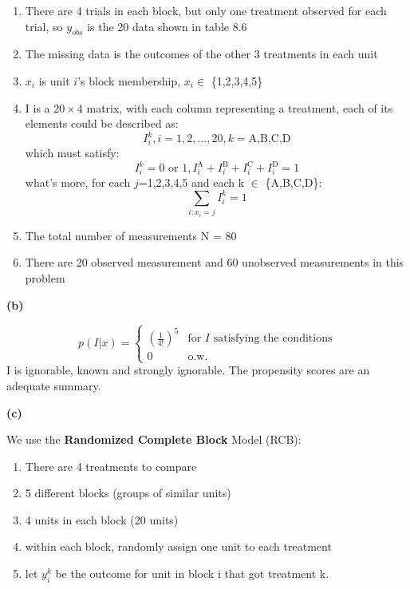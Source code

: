 \documentclass[letterpaper,11pt]{article}
\begin{document}
\begin{enumerate}
  \item There are 4 trials in each block, but only one treatment observed for each trial, so $y_{obs}$ is the 20 data shown in table 8.6
\item The missing data is the outcomes of the other 3 treatments in each unit
\item $x_i$ is unit $i$'s block membership, $x_i\in$ \{1,2,3,4,5\}
\item I is a $20\times 4$ matrix, with each column representing a treatment, each of its elements could be described as:
$$I_i^k,i=1,2,...,20,k=\text{A,B,C,D}$$
which must satisfy:
$$I_i^k = 0 \text{ or } 1, I_i^\text{A}+I_i^\text{B}+I_i^\text{C}+I_i^\text{D}=1$$
what's more, for each $j$=1,2,3,4,5 and each k $\in$ \{A,B,C,D\}:
$$\sum_{i:x_i=j}I_i^k=1$$
\item The total number of measurements N = 80
\item There are 20 observed measurement and 60 unobserved measurements in this problem

\end{enumerate}


\begin{addmargin}[-1.1em]{0em} \textbf{(b)}\par \end{addmargin}

$$p(I\vert x)=\begin{cases}
	(\frac{1}{4!})^5&\text{for }I \text{ satisfying the conditions}\\
	0 &\text{o.w.}
\end{cases}$$
I is ignorable, known and strongly ignorable. The propensity scores are an adequate summary.
\bigbreak
\begin{addmargin}[-1.1em]{0em} \textbf{(c)}\par \end{addmargin}

We use the \textbf{Randomized Complete Block} Model (RCB):
\begin{enumerate}
  \item There are 4 treatments to compare
  \item 5 different blocks (groups of similar units)
  \item 4 units in each block (20 units)
  \item within each block, randomly assign one unit to each treatment
  \item let $y_i^k$ be the outcome for unit in block i that got treatment k.
\end{enumerate}
\end{document}
